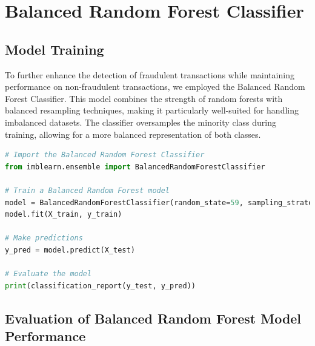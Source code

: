 \documentclass[12pt,a4paper]{report}
\begin{document}
\section{Balanced Random Forest Classifier}

\subsection{Model Training}

To further enhance the detection of fraudulent transactions while maintaining performance on non-fraudulent transactions, we employed the Balanced Random Forest Classifier. This model combines the strength of random forests with balanced resampling techniques, making it particularly well-suited for handling imbalanced datasets. The classifier oversamples the minority class during training, allowing for a more balanced representation of both classes.\\

\begin{lstlisting}[language=Python, caption={Training and Evaluation of Balanced Random Forest Classifier}]
# Import the Balanced Random Forest Classifier
from imblearn.ensemble import BalancedRandomForestClassifier

# Train a Balanced Random Forest model
model = BalancedRandomForestClassifier(random_state=59, sampling_strategy='all', replacement=True, bootstrap=False)
model.fit(X_train, y_train)

# Make predictions
y_pred = model.predict(X_test)

# Evaluate the model
print(classification_report(y_test, y_pred))
\end{lstlisting}

\subsection{Evaluation of Balanced Random Forest Model Performance}
\end{document}
